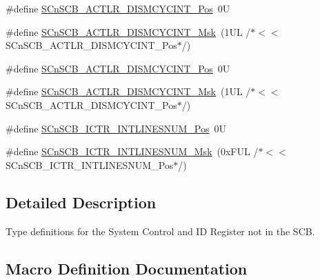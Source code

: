 \begin{DoxyCompactItemize}
\item 
\#define \mbox{\hyperlink{group___c_m_s_i_s___s_cn_s_c_b_gaaa3e79f5ead4a32c0ea742b2a9ffc0cd}{S\+Cn\+S\+C\+B\+\_\+\+A\+C\+T\+L\+R\+\_\+\+D\+I\+S\+M\+C\+Y\+C\+I\+N\+T\+\_\+\+Pos}}~0U
\item 
\#define \mbox{\hyperlink{group___c_m_s_i_s___s_cn_s_c_b_ga2a2818f0489ad10b6ea2964e899d4cbc}{S\+Cn\+S\+C\+B\+\_\+\+A\+C\+T\+L\+R\+\_\+\+D\+I\+S\+M\+C\+Y\+C\+I\+N\+T\+\_\+\+Msk}}~(1\+U\+L /$\ast$$<$$<$ S\+Cn\+S\+C\+B\+\_\+\+A\+C\+T\+L\+R\+\_\+\+D\+I\+S\+M\+C\+Y\+C\+I\+N\+T\+\_\+\+Pos$\ast$/)
\item 
\#define \mbox{\hyperlink{group___c_m_s_i_s___s_cn_s_c_b_gaaa3e79f5ead4a32c0ea742b2a9ffc0cd}{S\+Cn\+S\+C\+B\+\_\+\+A\+C\+T\+L\+R\+\_\+\+D\+I\+S\+M\+C\+Y\+C\+I\+N\+T\+\_\+\+Pos}}~0U
\item 
\#define \mbox{\hyperlink{group___c_m_s_i_s___s_cn_s_c_b_ga2a2818f0489ad10b6ea2964e899d4cbc}{S\+Cn\+S\+C\+B\+\_\+\+A\+C\+T\+L\+R\+\_\+\+D\+I\+S\+M\+C\+Y\+C\+I\+N\+T\+\_\+\+Msk}}~(1\+U\+L /$\ast$$<$$<$ S\+Cn\+S\+C\+B\+\_\+\+A\+C\+T\+L\+R\+\_\+\+D\+I\+S\+M\+C\+Y\+C\+I\+N\+T\+\_\+\+Pos$\ast$/)
\item 
\#define \mbox{\hyperlink{group___c_m_s_i_s___s_cn_s_c_b_ga0777ddf379af50f9ca41d40573bfffc5}{S\+Cn\+S\+C\+B\+\_\+\+I\+C\+T\+R\+\_\+\+I\+N\+T\+L\+I\+N\+E\+S\+N\+U\+M\+\_\+\+Pos}}~0U
\item 
\#define \mbox{\hyperlink{group___c_m_s_i_s___s_cn_s_c_b_ga3efa0f5210051464e1034b19fc7b33c7}{S\+Cn\+S\+C\+B\+\_\+\+I\+C\+T\+R\+\_\+\+I\+N\+T\+L\+I\+N\+E\+S\+N\+U\+M\+\_\+\+Msk}}~(0x\+F\+U\+L /$\ast$$<$$<$ S\+Cn\+S\+C\+B\+\_\+\+I\+C\+T\+R\+\_\+\+I\+N\+T\+L\+I\+N\+E\+S\+N\+U\+M\+\_\+\+Pos$\ast$/)
\end{DoxyCompactItemize}


\subsection{Detailed Description}
Type definitions for the System Control and ID Register not in the S\+CB. 



\subsection{Macro Definition Documentation}
\mbox{\label{group___c_m_s_i_s___s_cn_s_c_b_ga6cda7b7219232a008ec52cc8e89d5d08}} 
